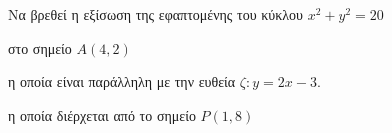 Να βρεθεί η εξίσωση της εφαπτομένης του κύκλου $ x^2+y^2=20 $
\begin{alist}
\item στο σημείο $ A(4,2) $
\item η οποία είναι παράλληλη με την ευθεία $ \zeta: y=2x-3 $.
\item η οποία διέρχεται από το σημείο $ P(1,8) $
\end{alist}
